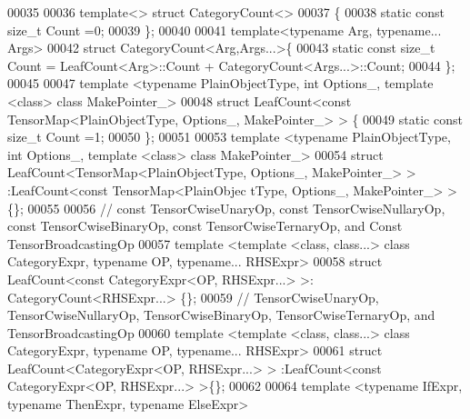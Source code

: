 \begin{DoxyCode}
00035 
00036 \textcolor{keyword}{template}<> \textcolor{keyword}{struct }CategoryCount<>
00037 \{
00038   \textcolor{keyword}{static} \textcolor{keyword}{const} \textcolor{keywordtype}{size\_t} Count =0;
00039 \};
00040 
00041 \textcolor{keyword}{template}<\textcolor{keyword}{typename} Arg, \textcolor{keyword}{typename}... Args>
00042 \textcolor{keyword}{struct }CategoryCount<Arg,Args...>\{
00043   \textcolor{keyword}{static} \textcolor{keyword}{const} \textcolor{keywordtype}{size\_t} Count = LeafCount<Arg>::Count + CategoryCount<Args...>::Count;
00044 \};
00045 
00047 \textcolor{keyword}{template} <\textcolor{keyword}{typename} PlainObjectType, \textcolor{keywordtype}{int} Options\_, \textcolor{keyword}{template} <\textcolor{keyword}{class}> \textcolor{keyword}{class }MakePointer\_>
00048 \textcolor{keyword}{struct }LeafCount<const TensorMap<PlainObjectType, Options\_, MakePointer\_> > \{
00049   \textcolor{keyword}{static} \textcolor{keyword}{const} \textcolor{keywordtype}{size\_t} Count =1;
00050 \};
00051 
00053 \textcolor{keyword}{template} <\textcolor{keyword}{typename} PlainObjectType, \textcolor{keywordtype}{int} Options\_, \textcolor{keyword}{template} <\textcolor{keyword}{class}> \textcolor{keyword}{class }MakePointer\_>
00054 \textcolor{keyword}{struct }LeafCount<TensorMap<PlainObjectType, Options\_, MakePointer\_> > :LeafCount<const TensorMap<PlainObjec
      tType, Options\_, MakePointer\_> >\{\};
00055 
00056 \textcolor{comment}{// const TensorCwiseUnaryOp, const TensorCwiseNullaryOp, const TensorCwiseBinaryOp, const
       TensorCwiseTernaryOp, and Const TensorBroadcastingOp}
00057 \textcolor{keyword}{template} <\textcolor{keyword}{template} <\textcolor{keyword}{class}, \textcolor{keyword}{class}...> \textcolor{keyword}{class }CategoryExpr, \textcolor{keyword}{typename} OP, \textcolor{keyword}{typename}... RHSExpr>
00058 \textcolor{keyword}{struct }LeafCount<const CategoryExpr<OP, RHSExpr...> >: CategoryCount<RHSExpr...> \{\};
00059 \textcolor{comment}{// TensorCwiseUnaryOp,  TensorCwiseNullaryOp,  TensorCwiseBinaryOp,  TensorCwiseTernaryOp, and 
       TensorBroadcastingOp}
00060 \textcolor{keyword}{template} <\textcolor{keyword}{template} <\textcolor{keyword}{class}, \textcolor{keyword}{class}...> \textcolor{keyword}{class }CategoryExpr, \textcolor{keyword}{typename} OP, \textcolor{keyword}{typename}... RHSExpr>
00061 \textcolor{keyword}{struct }LeafCount<CategoryExpr<OP, RHSExpr...> > :LeafCount<const CategoryExpr<OP, RHSExpr...> >\{\};
00062 
00064 \textcolor{keyword}{template} <\textcolor{keyword}{typename} IfExpr, \textcolor{keyword}{typename} ThenExpr, \textcolor{keyword}{typename} ElseExpr>

\end{DoxyCode}
